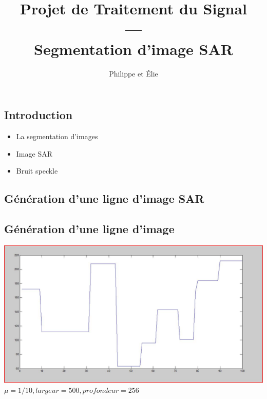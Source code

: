 \documentclass{beamer}
\title{Projet de Traitement du Signal\\---\\Segmentation d'image SAR}
\author{Philippe \bsc{Tran Ba} et Élie \bsc{Bouttier}}
\institute{ENSEEIHT, département TR}
\newcommand{\FSource}[1]{%
  
  }
\begin{document}
\begin{frame}
\titlepage
\end{frame}

\begin{frame}
\tableofcontents
\end{frame}

\begin{frame}
\section{Introduction}
\begin{itemize}
 \item La segmentation d'images
 \item Image SAR
 \item Bruit speckle
\end{itemize}
\end{frame}

\begin{frame}
\section{Génération d'une ligne d'image SAR}
\subsection{Génération d'une ligne d'image}
\FSource{matlab/genligne.m}
\end{frame}

\begin{frame}
\begin{center}
\includegraphics[scale=0.35]{capture/Capturer.JPG}\\
$\mu=1/10, largeur=500, profondeur=256$
\end{center}
\end{frame}
\end{document}
